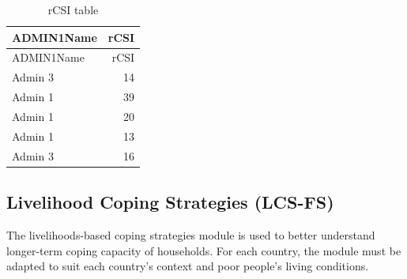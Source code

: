 \documentclass[
  letterpaper,
  DIV=11,
  numbers=noendperiod]{scrreprt}
\begin{document}
\begin{longtable}[]{@{}lr@{}}
\caption{rCSI table}\tabularnewline
\toprule\noalign{}
ADMIN1Name & rCSI \\
\midrule\noalign{}
\endfirsthead
\toprule\noalign{}
ADMIN1Name & rCSI \\
\midrule\noalign{}
\endhead
\bottomrule\noalign{}
\endlastfoot
Admin 3 & 14 \\
Admin 1 & 39 \\
Admin 1 & 20 \\
Admin 1 & 13 \\
Admin 3 & 16 \\
\end{longtable}

\hypertarget{livelihood-coping-strategies-lcs-fs}{%
\subsection{Livelihood Coping Strategies
(LCS-FS)}\label{livelihood-coping-strategies-lcs-fs}}

The livelihoods-based coping strategies module is used to better
understand longer-term coping capacity of households. For each country,
the module must be adapted to suit each country's context and poor
people's living conditions.
\end{document}
